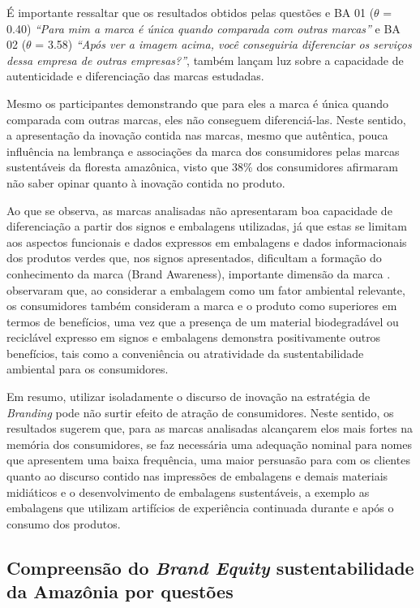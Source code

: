 É importante ressaltar que os resultados obtidos pelas questões e BA 01 ($\theta$ = 0.40) \textit{“Para mim a marca é única quando comparada com outras marcas”} e BA 02 ($\theta$ = 3.58) \textit{“Após ver a imagem acima, você conseguiria diferenciar os serviços dessa empresa de outras empresas?”}, também lançam luz sobre a capacidade de autenticidade e diferenciação das marcas estudadas.

Mesmo os participantes demonstrando que para eles a marca é única quando comparada com outras marcas, eles não conseguem diferenciá-las. Neste sentido, a apresentação da inovação contida nas marcas, mesmo que autêntica, pouca influência na lembrança e associações da marca dos consumidores pelas marcas sustentáveis da floresta amazônica, visto que 38\% dos consumidores afirmaram não saber opinar quanto à inovação contida no produto. 

Ao que se observa, as marcas analisadas não apresentaram boa capacidade de diferenciação a partir dos signos e embalagens utilizadas, já que estas se limitam aos aspectos funcionais e dados expressos em embalagens e dados informacionais dos produtos verdes que, nos signos apresentados, dificultam a formação do conhecimento da marca (Brand Awareness), importante dimensão da marca \cite{Keller2019StrategicProcess}.  observaram que, ao considerar a embalagem como um fator ambiental relevante, os consumidores também consideram a marca e o produto como superiores em termos de benefícios, uma vez que a presença de um material biodegradável ou reciclável expresso em signos e embalagens demonstra positivamente outros benefícios, tais como a conveniência ou atratividade da sustentabilidade ambiental para os consumidores.

Em resumo, utilizar isoladamente o discurso de inovação na estratégia de \textit{Branding} pode não surtir efeito de atração de consumidores. Neste sentido, os resultados sugerem que, para as marcas analisadas alcançarem elos mais fortes na memória dos consumidores, se faz necessária uma adequação nominal para nomes que apresentem uma baixa frequência, uma maior persuasão para com os clientes quanto ao discurso contido nas impressões de embalagens e demais materiais midiáticos \cite{Siegrist2015FactorsStudy,Vincenzi2018AssessmentBrazil} e o desenvolvimento de embalagens sustentáveis, a exemplo as embalagens que utilizam artifícios de experiência continuada durante e após o consumo dos produtos. 

\subsection{Compreensão do \textit{Brand Equity} sustentabilidade da Amazônia por questões}


